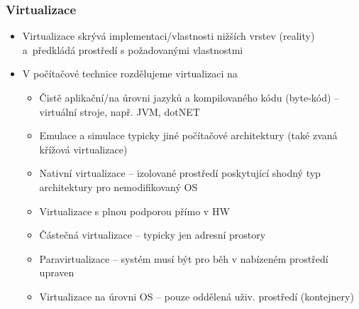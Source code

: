 \documentclass{beamer}
\begin{document}
\begin{frame}
\frametitle{Virtualizace}

\begin{itemize}
 \item Virtualizace skrývá implementaci/vlastnosti nižších vrstev (reality) a předkládá prostředí s požadovanými vlastnostmi
 \item V počítačové technice rozdělujeme virtualizaci na
 \begin{itemize}
  \item Čistě aplikační/na úrovni jazyků a kompilovaného kódu (byte-kód) – virtuální stroje, např. JVM, dotNET
  \item Emulace a simulace typicky jiné počítačové architektury (také zvaná křížová virtualizace)
  \item Nativní virtualizace – izolované prostředí poskytující shodný typ architektury pro nemodifikovaný OS
  \item Virtualizace s plnou podporou přímo v HW
  \item Částečná virtualizace -- typicky jen adresní prostory
  \item Paravirtualizace -- systém musí být pro běh v nabízeném prostředí upraven
  \item Virtualizace na úrovni OS -- pouze oddělená uživ. prostředí (kontejnery)
 \end{itemize}
\end{itemize}
\end{frame}
\end{document}
